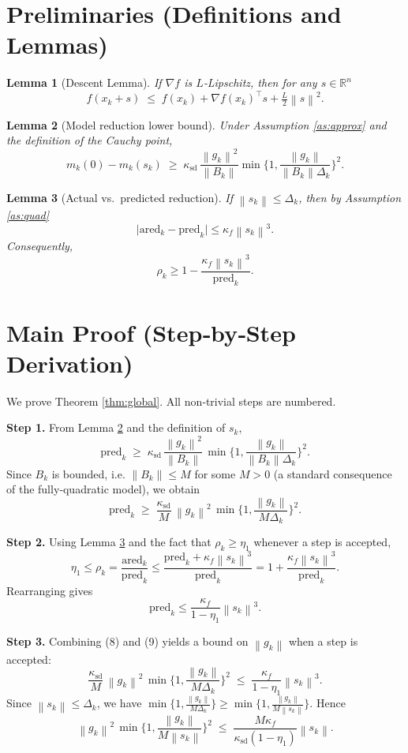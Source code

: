 \documentclass{article}
\newtheorem{lemma}{Lemma}
\newcommand{\norm}[1]{\left\lVert #1\right\rVert}
\newcommand{\R}{\mathbb{R}}
\begin{document}
\newpage
\section*{Preliminaries (Definitions and Lemmas)}
\begin{lemma}[Descent Lemma]\label{lem:descent}
If $\nabla f$ is $L$‑Lipschitz, then for any $s\in\R^n$
\[
f(x_k+s)\;\le\; f(x_k)+\nabla f(x_k)^{\top}s+\tfrac{L}{2}\norm{s}^2 .
\tag{3}
\]
\end{lemma}
\begin{lemma}[Model reduction lower bound]\label{lem:pred}
Under Assumption \ref{as:approx} and the definition of the Cauchy point,
\[
m_k(0)-m_k(s_k)\;\ge\;\kappa_{\text{sd}}\,\frac{\norm{g_k}^2}{\norm{B_k}} \min\!\Big\{1,\frac{\norm{g_k}}{\norm{B_k}\Delta_k}\Big\}^2 .
\tag{4}
\]
\end{lemma}
\begin{lemma}[Actual vs.\ predicted reduction]\label{lem:ratio}
If $\norm{s_k}\le\Delta_k$, then by Assumption \ref{as:quad}
\[
\big|\text{ared}_k-\text{pred}_k\big|
      \le \kappa_f \norm{s_k}^3 .
\tag{5}
\]
Consequently,
\[
\rho_k \ge 1-\frac{\kappa_f\norm{s_k}^3}{\text{pred}_k}.
\tag{6}
\]
\end{lemma}

\section*{Main Proof (Step‑by‑Step Derivation)}
We prove Theorem \ref{thm:global}.  All non‑trivial steps are numbered.

\noindent\textbf{Step 1.} From Lemma \ref{lem:pred} and the definition of $s_k$,
\[
\text{pred}_k\;\ge\;\kappa_{\text{sd}}\,
\frac{\norm{g_k}^2}{\norm{B_k}}\,
\min\!\Big\{1,\frac{\norm{g_k}}{\norm{B_k}\Delta_k}\Big\}^2 .
\tag{7}
\]
Since $B_k$ is bounded, i.e. $\norm{B_k}\le M$ for some $M>0$ (a standard consequence of the fully‑quadratic model), we obtain
\[
\text{pred}_k\;\ge\;\frac{\kappa_{\text{sd}}}{M}\,
\norm{g_k}^2\,
\min\!\Big\{1,\frac{\norm{g_k}}{M\Delta_k}\Big\}^2 .
\tag{8}
\]

\noindent\textbf{Step 2.} Using Lemma \ref{lem:ratio} and the fact that $\rho_k\ge\eta_1$ whenever a step is accepted,
\[
\eta_1\le\rho_k
   =\frac{\text{ared}_k}{\text{pred}_k}
   \le\frac{\text{pred}_k+\kappa_f\norm{s_k}^3}{\text{pred}_k}
   =1+\frac{\kappa_f\norm{s_k}^3}{\text{pred}_k}.
\]
Rearranging gives
\[
\text{pred}_k\le\frac{\kappa_f}{1-\eta_1}\norm{s_k}^3 .
\tag{9}
\]

\noindent\textbf{Step 3.} Combining (8) and (9) yields a bound on $\norm{g_k}$ when a step is accepted:
\[
\frac{\kappa_{\text{sd}}}{M}\,
\norm{g_k}^2\,
\min\!\Big\{1,\frac{\norm{g_k}}{M\Delta_k}\Big\}^2
   \;\le\;
\frac{\kappa_f}{1-\eta_1}\norm{s_k}^3 .
\tag{10}
\]
Since $\norm{s_k}\le\Delta_k$, we have $\min\{1,\frac{\norm{g_k}}{M\Delta_k}\}\ge
\min\{1,\frac{\norm{g_k}}{M\norm{s_k}}\}$.  Hence
\[
\norm{g_k}^2\,
\min\!\Big\{1,\frac{\norm{g_k}}{M\norm{s_k}}\Big\}^2
   \;\le\;
\frac{M\kappa_f}{\kappa_{\text{sd}}(1-\eta_1)}\norm{s_k} .
\tag{11}
\]
\end{document}
